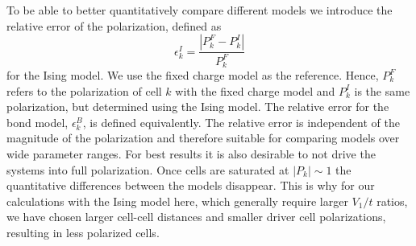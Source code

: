 To be able to better quantitatively compare different models we introduce the
relative error of the polarization, defined as
%
\begin{equation}
  \epsilon^I_k = \frac{\left|P^F_k - P^I_k\right|}{P^F_k}
\end{equation}
%
for the Ising model. We use the fixed charge model as the reference. Hence,
$P^F_k$ refers to the polarization of cell $k$ with the fixed charge
model and $P^I_k$ is the same polarization, but determined using the Ising
model. The relative error for the bond model, $\epsilon^B_k$, is defined
equivalently. The relative error is independent of the magnitude of the
polarization and therefore suitable for comparing models over wide parameter
ranges. For best results it is also desirable to not drive the systems
into full polarization. Once cells are saturated at $\left| P_k \right| \sim 1$
the quantitative differences between the models disappear. This is why for our
calculations with the Ising model here, which generally require larger $V_1/t$
ratios, we have chosen larger cell-cell distances and smaller driver cell
polarizations, resulting in less polarized cells.

